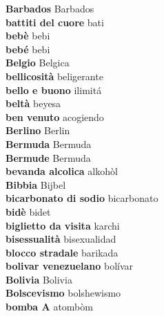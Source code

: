 \textbf{ Barbados  } Barbados \\
\textbf{ battiti del cuore  } bati \\
\textbf{ bebè  } bebi \\
\textbf{ bebé  } bebi \\
\textbf{ Belgio  } Belgica \\
\textbf{ bellicosità  } beligerante \\
\textbf{ bello e buono  } ilimitá \\
\textbf{ beltà  } beyesa \\
\textbf{ ben venuto  } acogiendo \\
\textbf{ Berlino  } Berlin \\
\textbf{ Bermuda  } Bermuda \\
\textbf{ Bermude  } Bermuda \\
\textbf{ bevanda alcolica  } alkohòl \\
\textbf{ Bibbia  } Bijbel \\
\textbf{ bicarbonato di sodio  } bicarbonato \\
\textbf{ bidè  } bidet \\
\textbf{ biglietto da visita  } karchi \\
\textbf{ bisessualità  } bisexualidad \\
\textbf{ blocco stradale  } barikada \\
\textbf{ bolivar venezuelano  } bolívar \\
\textbf{ Bolivia  } Bolivia \\
\textbf{ Bolscevismo  } bolshewismo \\
\textbf{ bomba A  } atombòm \\

